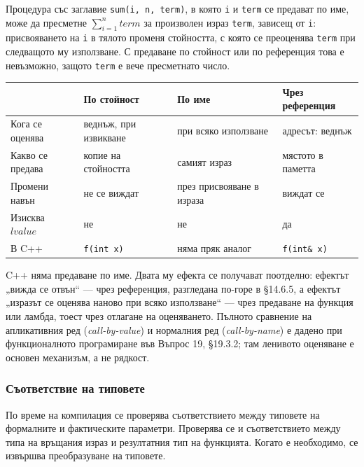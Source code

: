 \begin{example}
Процедура със заглавие \verb|sum(i, n, term)|, в която \verb|i| и \verb|term| се
предават по име, може да пресметне $\sum_{i=1}^{n}\mathit{term}$ за произволен
израз \verb|term|, зависещ от \verb|i|: присвояването на \verb|i| в тялото
променя стойността, с която се преоценява \verb|term| при следващото му
използване. С предаване по стойност или по референция това е невъзможно, защото
\verb|term| е вече пресметнато число.
\end{example}

\begin{center}
\small
\begin{tabular}{llll}
\toprule
& По стойност & По име & Чрез референция\\
\midrule
Кога се оценява & веднъж, при извикване & при всяко използване & адресът: веднъж\\
Какво се предава & копие на стойността & самият израз & мястото в паметта\\
Промени навън & не се виждат & през присвояване в израза & виждат се\\
Изисква $lvalue$ & не & не & да\\
В C++ & \verb|f(int x)| & няма пряк аналог & \verb|f(int& x)|\\
\bottomrule
\end{tabular}
\end{center}

\begin{remark}
C++ няма предаване по име. Двата му ефекта се получават поотделно: ефектът
„вижда се отвън“ --- чрез референция, разгледана по-горе в \S14.6.5, а ефектът
„изразът се оценява наново при всяко използване“ --- чрез предаване на функция
или ламбда, тоест
чрез отлагане на оценяването. Пълното сравнение на апликативния ред
(\emph{call-by-value}) и нормалния ред (\emph{call-by-name}) е дадено при
функционалното програмиране във Въпрос 19, \S19.3.2; там ленивото оценяване е
основен механизъм, а не рядкост.
\end{remark}

\subsubsection{Съответствие на типовете}

По време на компилация се проверява съответствието между типовете на формалните и фактическите параметри. Проверява се и съответствието между типа на връщания израз и резултатния тип на функцията. Когато е необходимо, се извършва преобразуване на типовете.

